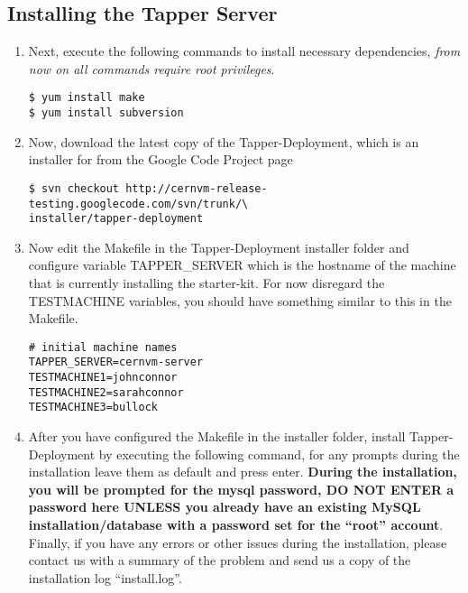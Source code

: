 \subsection{Installing the Tapper Server}
\label{installtapserver}
\begin{enumerate}
\item 	Next, execute the following commands to install necessary dependencies, \emph{from now on all commands require root privileges}.
\lstset{caption= Install Dependencies}
\begin{lstlisting}
$ yum install make
$ yum install subversion
\end{lstlisting}

\item 	Now, download the latest copy of the Tapper-Deployment, which is an installer for \tapper from the \cernvmreleasetesting 
		Google Code Project page
\lstset{caption= Download Tapper-Deployment}
\begin{lstlisting}
$ svn checkout http://cernvm-release-testing.googlecode.com/svn/trunk/\
installer/tapper-deployment
\end{lstlisting}

\item 	Now edit the Makefile in the Tapper-Deployment installer folder and configure variable TAPPER\_SERVER which 
		is the hostname of the machine that is currently installing the starter-kit. For now disregard the TESTMACHINE 
		variables, you should have something similar to this in the Makefile.
\lstset{caption= Makefile Configuration}
\begin{lstlisting}
# initial machine names
TAPPER_SERVER=cernvm-server
TESTMACHINE1=johnconnor
TESTMACHINE2=sarahconnor
TESTMACHINE3=bullock
\end{lstlisting}

\item 	After you have configured the Makefile in the installer folder, install Tapper-Deployment by executing the
		following command, for any prompts during the installation leave them as default and press enter. {\bf During
		the installation, you will be prompted for the mysql password, DO NOT ENTER a password here UNLESS you already have an
		existing MySQL installation/database with a password set for the ``root'' account}. Finally, if you have any errors or
		other issues during the installation, please contact us with a summary of the problem and send us a copy of the installation 
		log ``install.log''.

\begin{comment}
%
%


\end{comment}
\end{enumerate}
